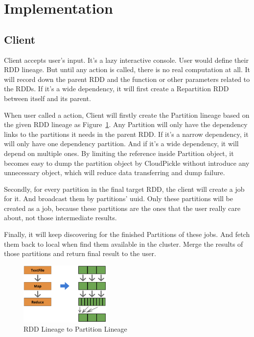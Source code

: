 
\section{Implementation} %
\label{sec:implementation}

\subsection{Client} %
\label{sub:client}
Client accepts user's input. It's a lazy interactive console.
User would define their RDD lineage. But until any action is called, there is no real computation at all.
It will record down the parent RDD and the function or other parameters related to the RDDs\@.
If it's a wide dependency, it will first create a Repartition RDD between itself and its parent.

When user called a action, Client will firstly create the Partition lineage based on the given RDD lineage as Figure~\ref{fig:partition_lineage}.
Any Partition will only have the dependency links to the partitions it needs in the parent RDD\@.
If it's a narrow dependency, it will only have one dependency partition.
And if it's a wide dependency, it will depend on multiple ones.
By limiting the reference inside Partition object,
it becomes easy to dump the partition object by CloudPickle\cite{cloudpickle} without introduce any unnecessary object,
which will reduce data transferring and dump failure.

Secondly, for every partition in the final target RDD, the client will create a job for it.
And broadcast them by partitions' uuid.
Only these partitions will be created as a job,
because these partitions are the ones that the user really care about, not those intermediate results.

Finally, it will keep discovering for the finished Partitions of these jobs.
And fetch them back to local when find them available in the cluster.
Merge the results of those partitions and return final result to the user.

\begin{figure}[htb]
    \centering
    \includegraphics[width=0.4\textwidth]{images/partition_lineage.png}
    \caption{RDD Lineage to Partition Lineage}\label{fig:partition_lineage}
\end{figure}

